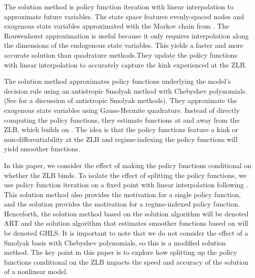 \documentclass[12pt, final]{article}
\begin{document}
The \hyperlink{Atkinson}{\color{black}{Atkinson et al.\ (2019)}} solution method is policy function iteration with linear interpolation to approximate future variables.  The state space features evenly-spaced nodes and exogenous state variables  approximated with the Markov chain from \hyperlink{Rouwenhorst}{\color{black}{Rouwenhorst (1995)}}. The Rouwenhorst approximation is useful because it only requires interpolation along the dimensions of the endogenous state variables. This yields a faster and more accurate solution than quadrature methods.They update the policy functions with linear interpolation to accurately capture the kink experienced at the ZLB.

The \hyperlink{Gust}{\color{black}{Gust et al.\ (2017)}} solution method approximates policy functions underlying the model's decision rule using an antistropic Smolyak method with Chebyshev polynomials. (See \hyperlink{Judd2}{\color{black}{Judd et al.\ (2014)}} for a discussion of antistropic Smolyak methods). They approximate the exogenous state variables using Gauss-Hermite quadrature. Instead of directly computing the policy functions, they estimate functions at and away from the ZLB, which builds on \hyperlink{Christiano}{\color{black}{Christiano and Fisher (2000)}}. The idea is that the policy functions feature a kink or non-differentiability at the ZLB and regime-indexing the policy functions will yield smoother functions. 

In this paper, we consider the effect of making the policy functions conditional on whether the ZLB binds. To isolate the effect of splitting the policy functions, we use policy function iteration on a fixed point with linear interpolation following \hyperlink{Atkinson}{\color{black}{Atkinson et al.\ (2019)}}. This solution method also provides the motivation for a single policy function, and the \hyperlink{Gust}{\color{black}{Gust et al.\ (2017)}} solution provides the motivation for a regime-indexed policy function. Henceforth, the solution method based on the \hyperlink{Atkinson}{\color{black}{Atkinson et al.\ (2019)}} solution algorithm will be denoted ART and the solution algorithm that estimates smoother functions based on \hyperlink{Gust}{\color{black}{Gust et al.\ (2017)}} will be denoted GHLS. It is important to note that we do not consider the effect of a Smolyak basis with Chebyshev polynomials, so this is a modified \hyperlink{Gust}{\color{black}{Gust et al.\ (2017)}} solution method. The key point in this paper is to explore how splitting up the policy functions conditional on the ZLB impacts the speed and accuracy of the solution of a nonlinear model. 
\end{document}
